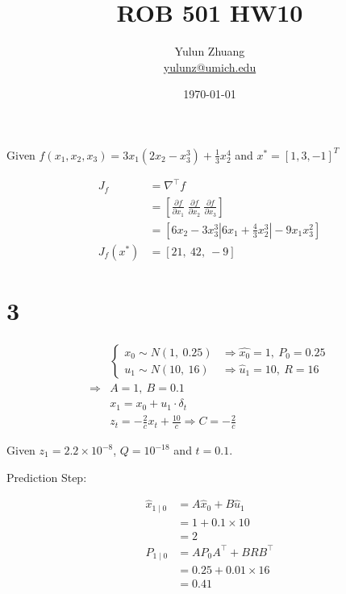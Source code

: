 \documentclass{article}
\title{ROB 501 HW10}
\author{Yulun Zhuang \\ \href{mailto:yulunz@umich.edu}{yulunz@umich.edu}}
\date{\today}
\theoremstyle{definition} %
\begin{document}
\maketitle

\section{}
\subsection{}

Given $f\left(x_1, x_2, x_3\right) =3 x_1\left(2 x_2-x_3^3\right)+\frac{1}{3} x_2^4$ and $x^* = [1, 3, -1]^T$

\begin{align*}
    J_f&=\nabla^{\top} f \\
    &=\left[\frac{\partial f}{\partial x_1}\ \frac{\partial f}{\partial x_2}\ \frac{\partial f}{\partial x_3}\right] \\
    &=\left[6 x_2-3 x_3^3\left|6 x_1+\frac{4}{3} x_2^3\right|-9 x_1 x_3^2\right] \\
    J_f\left(x^*\right) &=[21,\ 42,\ -9]
\end{align*}



\section*{3}

\begin{align*}
    &\left\{\begin{array}{ll}
    x_0 \sim N(1,\ 0.25) &\Rightarrow \hat{x_0}=1,\ P_0=0.25 \\
    u_1 \sim N(10,\ 16) &\Rightarrow \hat{u}_1=10,\ R=16
    \end{array}\right. \\
    \Rightarrow &A=1,\ B=0.1 \\
    &x_1=x_0+u_1 \cdot \delta_t \\
    &z_t=-\frac{2}{c} x_t+\frac{10}{c} \Rightarrow C=-\frac{2}{c}
\end{align*}

Given $z_1 = 2.2\times 10^{-8}$, $Q = 10^{-18}$ and $t=0.1$.

Prediction Step:

\begin{align*}
    \hat{x}_{1\mid 0} &=A \hat{x}_0+B \hat{u}_1 \\
    &=1+0.1 \times 10 \\
    &=2 \\
    P_{1\mid 0} &=A P_0 A^{\top}+B R B^{\top} \\
    &=0.25+0.01 \times 16 \\
    &=0.41
\end{align*}
\end{document}
